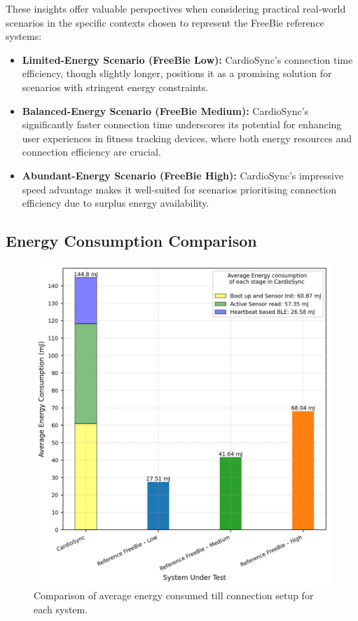 \noindent These insights offer valuable perspectives when considering practical real-world scenarios in the specific contexts chosen to represent the FreeBie reference systems:

\begin{itemize}
    \item \textbf{Limited-Energy Scenario (FreeBie Low):} CardioSync's connection time efficiency, though slightly longer, positions it as a promising solution for scenarios with stringent energy constraints.
    
    \item \textbf{Balanced-Energy Scenario (FreeBie Medium):} CardioSync's significantly faster connection time underscores its potential for enhancing user experiences in fitness tracking devices, where both energy resources and connection efficiency are crucial.
    
    \item \textbf{Abundant-Energy Scenario (FreeBie High):} CardioSync's impressive speed advantage makes it well-suited for scenarios prioritising connection efficiency due to surplus energy availability.
\end{itemize}


\subsection{Energy Consumption Comparison}
\begin{figure}[t]
    \centering
    \includegraphics[width=0.7\linewidth]{chapters/Results/Energy_comparison.png}
    \caption{Comparison of average energy consumed till connection setup for each system.}
    \label{fig:energy_comp}
\end{figure}

